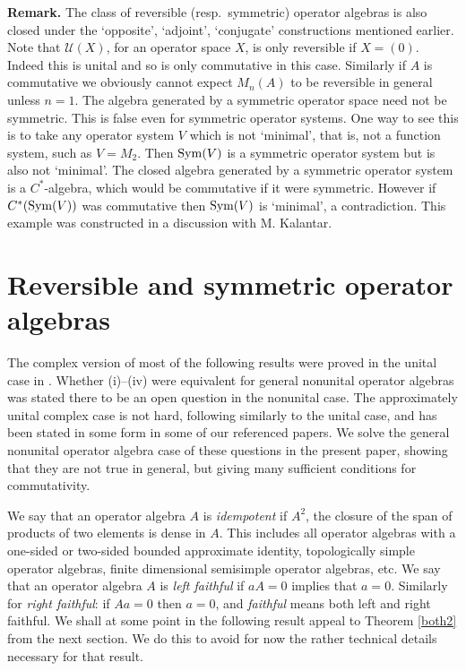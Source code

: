 \documentclass{amsart}
\theoremstyle{remark}
\theoremstyle{definition}
\numberwithin{equation}{section}
\begin{document}
{\bf Remark.}  The class of reversible (resp.\ symmetric) operator algebras is also closed under the `opposite', `adjoint', `conjugate'
constructions mentioned earlier.  Note that ${\mathcal U}(X)$, for an operator space $X$, is only reversible if 
$X= (0)$.  Indeed this is unital and so is only commutative in this case.  Similarly if $A$ is commutative we obviously  cannot expect $M_n(A)$ to be reversible in general
unless $n = 1$.    The algebra generated by a symmetric operator space need not be symmetric.  This is false even for 
symmetric operator systems.  One way to see this is to take any operator system $V$ which is
not `minimal', that is, not a function system, such as $V = M_2$.    Then ${\rm Sym}(V)$ is a
symmetric operator system but is also not `minimal'.  The closed algebra generated by a symmetric operator system is a $C^*$-algebra, which would be commutative if it were symmetric.   However if $C^*({\rm Sym}(V))$ was commutative then 
${\rm Sym}(V)$ is `minimal', a contradiction.  This example was constructed in a discussion with  M. Kalantar.




\section{Reversible and symmetric operator algebras} \label{rsy}

The complex version of 
most of the following results were proved in the unital case in \cite{BComm}.  Whether 
(i)--(iv) were equivalent for general nonunital operator algebras 
was  stated there to be an open question in the nonunital case.  
 The approximately unital complex case is not hard, following similarly to the unital case, and has been stated in some form in some of our referenced papers.  We solve the general nonunital operator algebra case of these  questions in the present paper, showing that they are not true in general, but giving many sufficient conditions for commutativity. 

We say that an operator algebra $A$ is {\em idempotent} if $A^2$, the closure of the span of products of two elements is dense in $A$.   This includes all operator algebras with a one-sided or two-sided bounded approximate identity, topologically simple operator algebras,  finite dimensional semisimple operator algebras,   etc.
We say that an operator algebra $A$ is {\em left faithful} if $aA = 0$  implies that $a =0$.
Similarly for {\em right faithful}: if $Aa = 0$ then  $a =0$, and {\em faithful} means both left and right faithful.
We shall at some point in the following result appeal to Theorem \ref{both2} from the next section.  We do this to avoid for now the rather technical details necessary for that result. 
\end{document}
